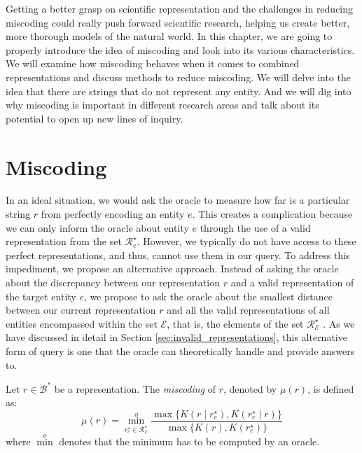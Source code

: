 Getting a better grasp on scientific representation and the challenges in reducing miscoding could really push forward scientific research, helping us create better, more thorough models of the natural world. In this chapter, we are going to properly introduce the idea of miscoding and look into its various characteristics. We will examine how miscoding behaves when it comes to combined representations and discuss methods to reduce miscoding. We will delve into the idea that there are strings that do not represent any entity. And we will dig into why miscoding is important in different research areas and talk about its potential to open up new lines of inquiry. 

%
%
\section{Miscoding}
\label{sec:miscoding}

In an ideal situation, we would ask the oracle to measure how far is a particular string $r$ from perfectly encoding an entity $e$. This creates a complication because we can only inform the oracle about entity $e$ through the use of a valid representation from the set $\mathcal{R}^\star_e$. However, we typically do not have access to these perfect representations, and thus, cannot use them in our query. To address this impediment, we propose an alternative approach. Instead of asking the oracle about the discrepancy between our representation $r$ and a valid representation of the target entity $e$, we propose to ask the oracle about the smallest distance between our current representation $r$ and all the valid representations of all entities encompassed within the set $\mathcal{E}$, that is, the elements of the set $\mathcal{R}^\star_\mathcal{E}$ . As we have discussed in detail in Section \ref{sec:invalid_representations}, this alternative form of query is one that the oracle can theoretically handle and provide answers to. 

\begin{definition} [Miscoding]
\label{def:miscoding}
Let $r \in \mathcal{B}^\ast$ be a representation. The \emph{miscoding} of $r$, denoted by $\mu(r)$, is defined as:
\[
\mu(r) = \overset{o}{ \underset{ r^\star_e \in \mathcal{R}^\star_\mathcal{E} } \min} \frac{ \max\{ K \left( r \mid r^\star_e \right), K \left( r^\star_e \mid r \right) \} } { \max\{ K \left( r \right), K \left( r^\star_e \right) \} }
\]
where $\overset{o}{\min}$ denotes that the minimum has to be computed by an oracle.
\end{definition}

